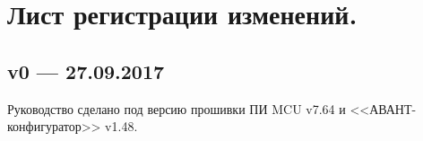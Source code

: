 \section*{Лист регистрации изменений.}

\subsection*{v0 --- 27.09.2017}

Руководство сделано под версию прошивки ПИ MCU v7.64 и <<АВАНТ-конфигуратор>> v1.48. 